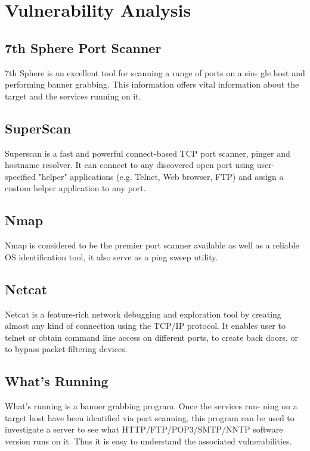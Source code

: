 \section{Vulnerability Analysis}

\subsection{7th Sphere Port Scanner}

7th Sphere is an excellent tool for scanning a range of ports on a sin-
gle host and performing banner grabbing. This information offers vital information
about the target and the services running on it.

\subsection{SuperScan}

Superscan is a fast and powerful connect-based TCP port scanner,
pinger and hostname resolver. It can connect to any discovered open port using
user-specified "helper" applications (e.g. Telnet, Web browser, FTP) and assign a
custom helper application to any port.

\subsection{Nmap}

Nmap is considered to be the premier port scanner available as well as
a reliable OS identification tool, it also serve as a ping sweep utility.


\subsection{Netcat}

Netcat is a feature-rich network debugging and exploration tool by
creating almost any kind of connection using the TCP/IP protocol. It enables user
to telnet or obtain command line access on different ports, to create back doors, or
to bypass packet-filtering devices.

\subsection{What's Running}

What's running is a banner grabbing program. Once the services run-
ning on a target host have been identified via port scanning, this program can be
used to investigate a server to see what HTTP/FTP/POP3/SMTP/NNTP software
version runs on it. Thus it is easy to understand the associated vulnerabilities.




